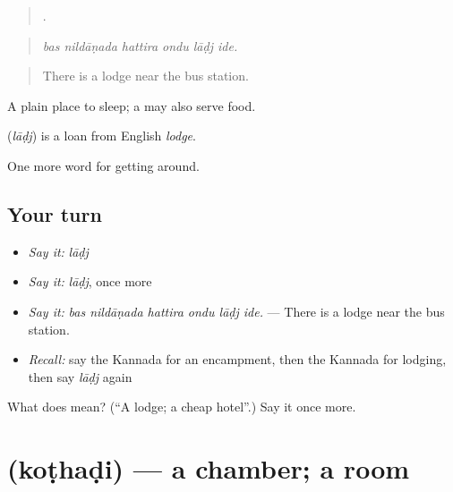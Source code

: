 \begin{quote}
     .
\end{quote}

\begin{quote}
\emph{bas nildāṇada hattira ondu lāḍj ide.}
\end{quote}

\begin{quote}
There is a lodge near the bus station.
\end{quote}

A plain place to sleep; a  may also serve food.

\begin{cousinweb}
\textbf{} (\emph{lāḍj}) is a loan from English \emph{lodge}.
\end{cousinweb}

\begin{grammarlens}[title={What you've built}]
One more word for getting around.
\end{grammarlens}

\subsection*{Your turn}
\begin{itemize}
\raggedright
  \item \emph{Say it:} \emph{lāḍj}
  \item \emph{Say it:} \emph{lāḍj}, once more
  \item \emph{Say it:} \emph{bas nildāṇada hattira ondu lāḍj ide.} — There is a lodge near the bus station.
  \item \emph{Recall:} say the Kannada for an encampment, then the Kannada for lodging, then say \emph{lāḍj} again
\end{itemize}

\begin{tcolorbox}[breakable,colback=teal!4,colframe=teal!35!black,title={Before you move on}]
What does  mean? (\textquotedblleft{}A lodge; a cheap hotel\textquotedblright{}.) Say it once more.
\end{tcolorbox}
\section[\texorpdfstring{\kn{ಕೊಠಡಿ} (koṭhaḍi)}{ಕೊಠಡಿ (koṭhaḍi)}]{ (koṭhaḍi) — a chamber; a room}

\label{lesson:KA-C460-kothadi}



